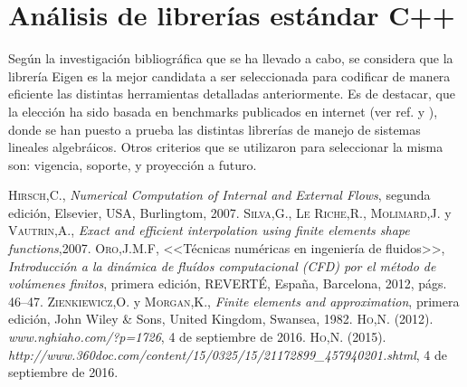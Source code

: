\section{Análisis de librerías estándar C++}

	Según la investigación bibliográfica que se ha llevado a cabo, se considera que la librería Eigen es la mejor candidata a ser seleccionada para codificar de manera eficiente las distintas herramientas detalladas anteriormente. Es de destacar, que la elección ha sido basada en benchmarks publicados en internet (ver ref. \cite{chino} y \cite{chino2}), donde se han puesto a prueba las distintas librerías de manejo de sistemas lineales algebráicos. Otros criterios que se utilizaron para seleccionar la misma son: vigencia, soporte, y proyección a futuro. 


\begin{thebibliography}{X}
 \textsc{Hirsch,C.},
\textit{Numerical Computation of Internal and External Flows}, segunda edición,
Elsevier, USA, Burlingtom, 2007.
 \textsc{Silva,G.}, \textsc{Le Riche,R.}, \textsc{Molimard,J.} y \textsc{Vautrin,A.},
\textit{Exact and efficient interpolation using finite elements shape functions},2007.
 \textsc{Oro,J.M.F},
<<Técnicas numéricas en ingeniería de fluidos>>,
\textit{Introducción a la dinámica de fluídos computacional (CFD) por el método de volúmenes finitos}, primera edición, REVERTÉ, España, Barcelona, 2012, págs. 46--47.
 \textsc{Zienkiewicz,O.} y \textsc{Morgan,K.}, 
\textit{Finite elements and approximation}, primera edición, John Wiley \& Sons, United Kingdom, Swansea, 1982.
 \textsc{Ho,N.} (2012).
\textit{www.nghiaho.com/?p=1726}, 4 de septiembre de 2016.
 \textsc{Ho,N.} (2015).
\textit{http://www.360doc.com/content/15/0325/15/21172899\_457940201.shtml}, 4 de septiembre de 2016.

\end{thebibliography}


